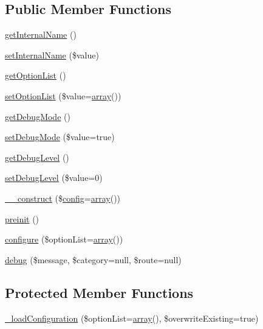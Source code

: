 \subsection*{Public Member Functions}
\begin{DoxyCompactItemize}
\item 
\hyperlink{classCPSComponent_aa18c8754403c04289ac8fbfc467df4ac}{getInternalName} ()
\item 
\hyperlink{classCPSComponent_a08e716b913e06fdbb77e84f81c0a3a35}{setInternalName} (\$value)
\item 
\hyperlink{classCPSComponent_a52c35bbfee5c247f621ad18691e23fdd}{getOptionList} ()
\item 
\hyperlink{classCPSComponent_a5526644e47e7f421422034ff564cce96}{setOptionList} (\$value=\hyperlink{list_8php_aa3205d038c7f8feb5c9f01ac4dfadc88}{array}())
\item 
\hyperlink{classCPSComponent_aef403af504f818f9acbff3caaa01cf69}{getDebugMode} ()
\item 
\hyperlink{classCPSComponent_ab98ee38db0a04475ae5d4e30d43c1651}{setDebugMode} (\$value=true)
\item 
\hyperlink{classCPSComponent_a122db96cedfc221cf187ce4328f992f7}{getDebugLevel} ()
\item 
\hyperlink{classCPSComponent_a8b687cb3cf73b9230fc575c9f3f23608}{setDebugLevel} (\$value=0)
\item 
\hyperlink{classCPSComponent_af7f9493844d2d66e924e3c1df51ce616}{\_\-\_\-construct} (\$\hyperlink{events_8php_a3f176ffce3afa63656bfc989470e3e24}{config}=\hyperlink{list_8php_aa3205d038c7f8feb5c9f01ac4dfadc88}{array}())
\item 
\hyperlink{classCPSComponent_a2dc262e99b1c246b56f27626bfe699ff}{preinit} ()
\item 
\hyperlink{classCPSComponent_abcd7278d34d95ce22a22fef8bcfc3887}{configure} (\$optionList=\hyperlink{list_8php_aa3205d038c7f8feb5c9f01ac4dfadc88}{array}())
\item 
\hyperlink{classCPSComponent_ac244c2556c9cf97650dffcaa0a3ec806}{debug} (\$message, \$category=null, \$route=null)
\end{DoxyCompactItemize}
\subsection*{Protected Member Functions}
\begin{DoxyCompactItemize}
\item 
\hyperlink{classCPSComponent_a6c061b5cf8d8bf0eebacbeb33c06b4cf}{\_\-loadConfiguration} (\$optionList=\hyperlink{list_8php_aa3205d038c7f8feb5c9f01ac4dfadc88}{array}(), \$overwriteExisting=true)
\end{DoxyCompactItemize}
